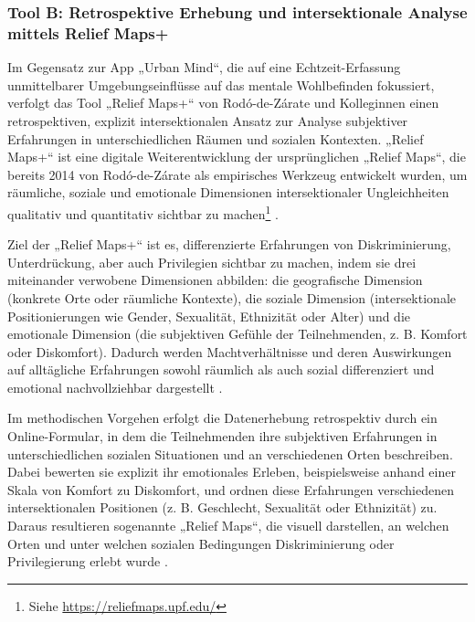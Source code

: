 \subsubsection{Tool B: Retrospektive Erhebung und intersektionale Analyse mittels Relief Maps+}

Im Gegensatz zur App „Urban Mind“, die auf eine Echtzeit-Erfassung unmittelbarer Umgebungseinflüsse auf das mentale Wohlbefinden fokussiert, verfolgt das Tool „Relief Maps+“ von Rodó-de-Zárate und Kolleg\*innen einen retrospektiven, explizit intersektionalen Ansatz zur Analyse subjektiver Erfahrungen in unterschiedlichen Räumen und sozialen Kontexten. „Relief Maps+“ ist eine digitale Weiterentwicklung der ursprünglichen „Relief Maps“, die bereits 2014 von Rodó-de-Zárate als empirisches Werkzeug entwickelt wurden, um räumliche, soziale und emotionale Dimensionen intersektionaler Ungleichheiten qualitativ und quantitativ sichtbar zu machen\footnote{Siehe \url{https://reliefmaps.upf.edu/}} \parencite{rodo-de-zarateDevelopingGeographiesIntersectionality2014, luizdesouzaSpiralValidationProcess2025}.

Ziel der „Relief Maps+“ ist es, differenzierte Erfahrungen von Diskriminierung, Unterdrückung, aber auch Privilegien sichtbar zu machen, indem sie drei miteinander verwobene Dimensionen abbilden: die geografische Dimension (konkrete Orte oder räumliche Kontexte), die soziale Dimension (intersektionale Positionierungen wie Gender, Sexualität, Ethnizität oder Alter) und die emotionale Dimension (die subjektiven Gefühle der Teilnehmenden, z. B. Komfort oder Diskomfort). Dadurch werden Machtverhältnisse und deren Auswirkungen auf alltägliche Erfahrungen sowohl räumlich als auch sozial differenziert und emotional nachvollziehbar dargestellt \parencite{rodo-de-zarateIntersectionalitySpatialityEmotions2023}.

Im methodischen Vorgehen erfolgt die Datenerhebung retrospektiv durch ein Online-Formular, in dem die Teilnehmenden ihre subjektiven Erfahrungen in unterschiedlichen sozialen Situationen und an verschiedenen Orten beschreiben. Dabei bewerten sie explizit ihr emotionales Erleben, beispielsweise anhand einer Skala von Komfort zu Diskomfort, und ordnen diese Erfahrungen verschiedenen intersektionalen Positionen (z. B. Geschlecht, Sexualität oder Ethnizität) zu. Daraus resultieren sogenannte „Relief Maps“, die visuell darstellen, an welchen Orten und unter welchen sozialen Bedingungen Diskriminierung oder Privilegierung erlebt wurde \parencite{luizdesouzaSpiralValidationProcess2025, rodo-de-zarateIntersectionalitySpatialityEmotions2023}.

